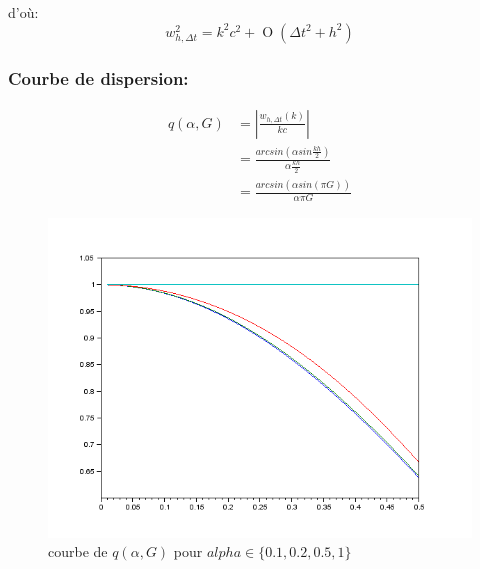 \documentclass{article}
\newcommand{\BigO}[1]{\ensuremath{\operatorname{O}\left(#1\right)}}
\begin{document}
d'où:
$$ w_{h, \Delta t}^2 = k^2 c^2 + \BigO { \Delta t^2 + h^2 } $$

\subsubsection*{Courbe de dispersion:}
\begin{align*}
q(\alpha, G) &= | \frac{w_{h, \Delta t}(k)}{kc} | \\
&=  \frac{arcsin( \alpha  sin \frac{kh}{2} )}{\alpha \frac{kh}{2}} \\
&=  \frac{arcsin( \alpha  sin(\pi G) )}{\alpha \pi G}
\end{align*}




\begin{figure}[h!]
\centering
\includegraphics[scale=0.5]{img/graphe1.png}
\caption{courbe de $q(\alpha, G)$ pour $alpha \in \{0.1, 0.2, 0.5, 1\}$}
\end{figure}
\end{document}
